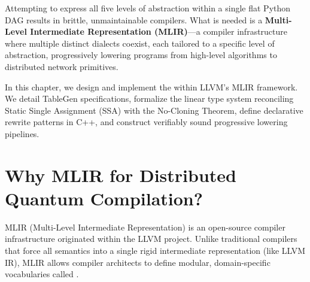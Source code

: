 Attempting to express all five levels of abstraction within a single flat Python DAG results in brittle, unmaintainable compilers. What is needed is a \textbf{Multi-Level Intermediate Representation (MLIR)}---a compiler infrastructure where multiple distinct dialects coexist, each tailored to a specific level of abstraction, progressively lowering programs from high-level algorithms to distributed network primitives.

In this chapter, we design and implement the  within LLVM's MLIR framework. We detail TableGen specifications, formalize the linear type system reconciling Static Single Assignment (SSA) with the No-Cloning Theorem, define declarative rewrite patterns in C++, and construct verifiably sound progressive lowering pipelines.

\section{Why MLIR for Distributed Quantum Compilation?}
\label{sec:why_mlir}

MLIR (Multi-Level Intermediate Representation) is an open-source compiler infrastructure originated within the LLVM project. Unlike traditional compilers that force all semantics into a single rigid intermediate representation (like LLVM IR), MLIR allows compiler architects to define modular, domain-specific vocabularies called .

